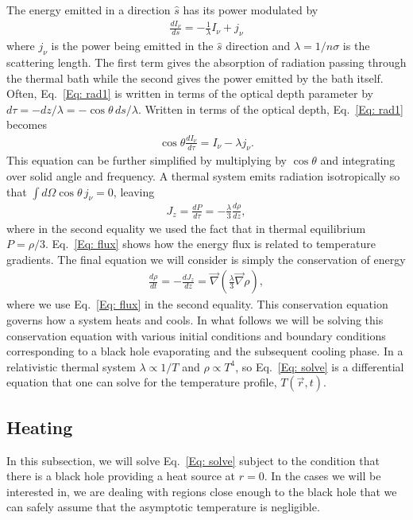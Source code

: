 \documentclass[superscriptaddress,groupedaddress,nofootnoteinbib,11pt]{article}
\newcommand\eea{\end{eqnarray}}
\newcommand\bea{\begin{eqnarray}}
\begin{document}
The energy emitted in a direction $\hat s$ has its power modulated by
\bea
\label{Eq: rad1}
\frac{dI_\nu}{ds} = - \frac{1}{\lambda} I_\nu + j_\nu
\eea
where $j_\nu$ is the power being emitted in the $\hat s$ direction and $\lambda = 1/n \sigma$  is the scattering length.
The first term gives the absorption of radiation passing through the thermal bath while the second gives the power emitted by the bath itself.
Often, Eq.~\ref{Eq: rad1} is written in terms of the optical depth parameter by $d \tau = -dz/\lambda = - \cos \theta \, ds/\lambda$.  Written in terms of the optical depth, Eq.~\ref{Eq: rad1} becomes
\bea
\cos \theta \frac{d I_\nu}{d \tau} = I_\nu - \lambda j_\nu.
\eea
This equation can be further simplified by multiplying by $\cos \theta$ and integrating over solid angle and frequency.  
A thermal system emits radiation isotropically so that $\int d\Omega \cos \theta \, j_\nu = 0$, leaving
\bea
\label{Eq: flux}
J_z = \frac{dP}{d\tau} = - \frac{\lambda}{3} \frac{d \rho}{d z},
\eea
where in the second equality we used the fact that in thermal equilibrium $P = \rho/3$.  Eq.~\ref{Eq: flux} shows how the energy flux is related to temperature gradients.
The final equation we will consider is simply the conservation of energy
\bea
\label{Eq: solve}
\frac{d \rho}{dt } = - \frac{d J_z}{d z} = \vec \nabla \left ( \frac{\lambda}{3} \vec \nabla \rho \right ) ,
\eea
where we use Eq.~\ref{Eq: flux} in the second equality. 
This conservation equation governs how a system heats and cools.
In what follows we will be solving this conservation equation with various initial conditions and boundary conditions corresponding to a black hole evaporating and the subsequent cooling phase.  In a relativistic thermal system $\lambda \propto 1/T$ and $\rho \propto T^4$, so Eq.~\ref{Eq: solve} is a differential equation that one can solve for the temperature profile, $T(\vec r,t)$.

\subsection{Heating} \label{Sec: heat}

In this subsection, we will solve Eq.~\ref{Eq: solve} subject to the condition that there is a black hole providing a heat source at $r= 0$.
In the cases we will be interested in, we are dealing with regions close enough to the black hole that we can safely assume that the asymptotic temperature is negligible.
\end{document}
